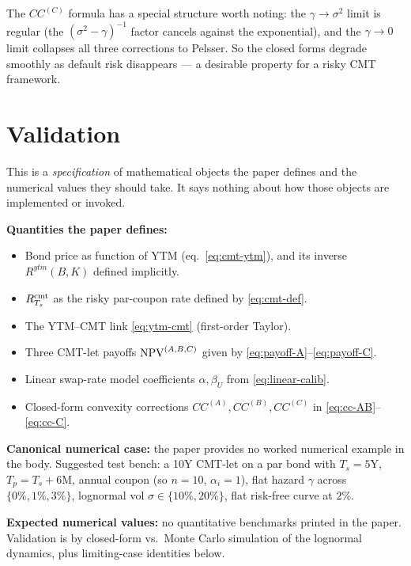 \documentclass[11pt,a4paper]{article}
\begin{document}
\begin{commentary}
The $CC^{(C)}$ formula has a special structure worth noting: the
$\gamma \to \sigma^2$ limit is regular (the $(\sigma^2 - \gamma)^{-1}$
factor cancels against the exponential), and the
$\gamma \to 0$ limit collapses all three corrections to
Pelsser. So the closed forms degrade smoothly as default risk
disappears --- a desirable property for a risky CMT framework.
\end{commentary}

\section{Validation}

\begin{validation}
This is a \emph{specification} of mathematical objects the paper
defines and the numerical values they should take. It says nothing
about how those objects are implemented or invoked.

\textbf{Quantities the paper defines:}
\begin{itemize}[noitemsep]
  \item Bond price as function of YTM (eq.~\ref{eq:cmt-ytm}), and its
        inverse $R^{ytm}(B, K)$ defined implicitly.
  \item $R^{\mathrm{cmt}}_{T_s}$ as the risky par-coupon rate defined by
        \eqref{eq:cmt-def}.
  \item The YTM--CMT link \eqref{eq:ytm-cmt} (first-order Taylor).
  \item Three CMT-let payoffs $\mathrm{NPV}^{(A,B,C)}$ given by
        \eqref{eq:payoff-A}--\eqref{eq:payoff-C}.
  \item Linear swap-rate model coefficients $\alpha, \beta_U$ from
        \eqref{eq:linear-calib}.
  \item Closed-form convexity corrections $CC^{(A)}, CC^{(B)}, CC^{(C)}$
        in \eqref{eq:cc-AB}--\eqref{eq:cc-C}.
\end{itemize}

\textbf{Canonical numerical case:} the paper provides no worked
numerical example in the body. Suggested test bench: a 10Y CMT-let
on a par bond with $T_s = 5$Y, $T_p = T_s + 6$M, annual coupon (so
$n = 10$, $\alpha_i = 1$), flat hazard $\gamma$ across
$\{0\%, 1\%, 3\%\}$, lognormal vol $\sigma \in \{10\%, 20\%\}$,
flat risk-free curve at $2\%$.

\textbf{Expected numerical values:} no quantitative benchmarks
printed in the paper. Validation is by closed-form vs.\ Monte Carlo
simulation of the lognormal dynamics, plus limiting-case identities
below.


\end{validation}
\end{document}
